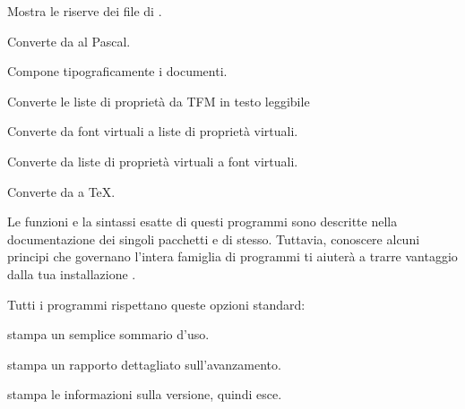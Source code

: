 \documentclass{article}
\begin{document}
\begin{cmddescription}
\item[pooltype]  Mostra le riserve dei file di \web{}.
\item[tangle]    Converte da \web{} al Pascal.
\item[tex]       Compone tipograficamente i documenti.
\item[tftopl]    Converte le liste di proprietà da TFM in testo leggibile
\item[vftovp]    Converte da font virtuali a liste di proprietà virtuali.
\item[vptovf]    Converte da liste di proprietà virtuali a font virtuali.
\item[weave]     Converte da \web{} a \TeX.
\end{cmddescription}

\noindent Le funzioni e la sintassi esatte di questi programmi sono
descritte nella documentazione dei singoli pacchetti e di \Webc{} stesso.
Tuttavia, conoscere alcuni principi che governano l'intera famiglia di
programmi ti aiuterà a trarre vantaggio dalla tua installazione \Webc{}.

Tutti i programmi rispettano queste opzioni \GNU{} standard:
\begin{ttdescription}
\item[-{}-help] stampa un semplice sommario d'uso.
\item[-{}-verbose] stampa un rapporto dettagliato sull'avanzamento.
\item[-{}-version] stampa le informazioni sulla versione, quindi esce.
\end{ttdescription}
\end{document}
